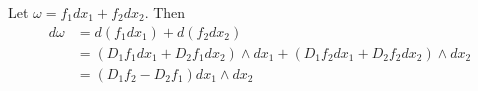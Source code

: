 \documentclass[12pt]{article}
\begin{document}
\begin{ex}
    Let $\omega = f_1dx_1 + f_2dx_2$. Then
    \begin{align*}
        d\omega &= d(f_1dx_1) + d(f_2dx_2) \\
                &= (D_1f_1dx_1 + D_2f_1dx_2)\wedge dx_1 + (D_1f_2dx_1 + D_2f_2dx_2) \wedge dx_2 \\
                &= (D_1f_2 - D_2f_1) dx_1 \wedge dx_2
    \end{align*}
\end{ex}
\end{document}
